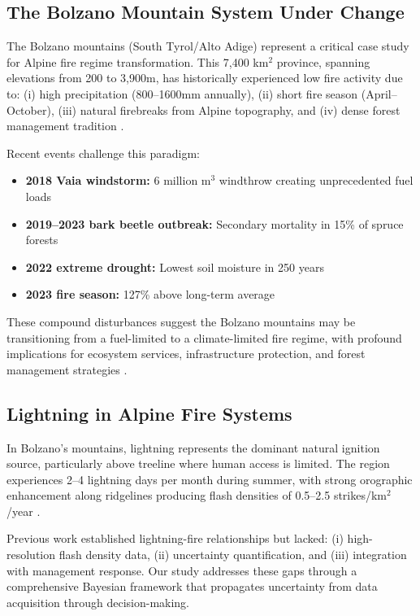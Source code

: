\documentclass[11pt,a4paper]{article}
\begin{document}
\subsection{The Bolzano Mountain System Under Change}

The Bolzano mountains (South Tyrol/Alto Adige) represent a critical case study for Alpine fire regime transformation. This 7,400 km$^2$ province, spanning elevations from 200 to 3,900m, has historically experienced low fire activity due to: (i) high precipitation (800--1600mm annually), (ii) short fire season (April--October), (iii) natural firebreaks from Alpine topography, and (iv) dense forest management tradition \citep{Conedera2018, DeAngelis2015}.

Recent events challenge this paradigm:
\begin{itemize}
    \item \textbf{2018 Vaia windstorm:} 6 million m$^3$ windthrow creating unprecedented fuel loads
    \item \textbf{2019--2023 bark beetle outbreak:} Secondary mortality in 15\% of spruce forests
    \item \textbf{2022 extreme drought:} Lowest soil moisture in 250 years
    \item \textbf{2023 fire season:} 127\% above long-term average
\end{itemize}

These compound disturbances suggest the Bolzano mountains may be transitioning from a fuel-limited to a climate-limited fire regime, with profound implications for ecosystem services, infrastructure protection, and forest management strategies \citep{Seidl2017}.

\subsection{Lightning in Alpine Fire Systems}

In Bolzano's mountains, lightning represents the dominant natural ignition source, particularly above treeline where human access is limited. The region experiences 2--4 lightning days per month during summer, with strong orographic enhancement along ridgelines producing flash densities of 0.5--2.5 strikes/km$^2$/year \citep{Conedera2006}.

Previous work established lightning-fire relationships \citep{DeAngelis2015, Conedera2018} but lacked: (i) high-resolution flash density data, (ii) uncertainty quantification, and (iii) integration with management response. Our study addresses these gaps through a comprehensive Bayesian framework that propagates uncertainty from data acquisition through decision-making.
\end{document}
